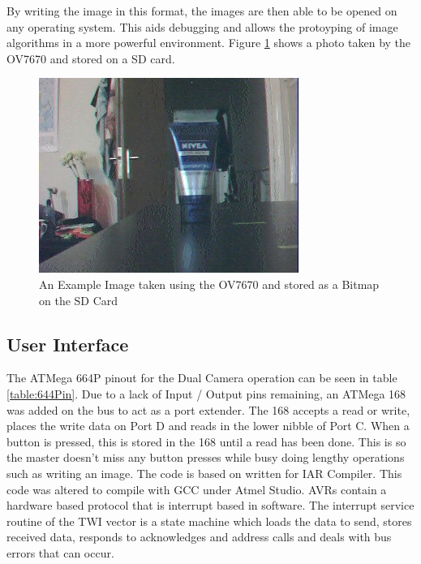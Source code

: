 By writing the image in this format, the images are then able to be opened on any operating system. This aids debugging and allows the protoyping of image algorithms in a more powerful environment. Figure \ref{ExampleImage} shows a photo taken by the OV7670 and stored on a SD card.

\begin{figure}
\begin{center}
\includegraphics{Figures/ExampleImageFromCamera.jpg} 
\end{center}
\caption{An Example Image taken using the OV7670 and stored as a Bitmap on the SD Card}
\label{ExampleImage}
\end{figure}

\subsection{User Interface}
The ATMega 664P pinout for the Dual Camera operation can be seen in table \ref{table:644Pin}. Due to a lack of Input / Output pins remaining, an ATMega 168 was added on the \itc bus to act as a port extender. The 168 accepts a read or write, places the write data on Port D and reads in the lower nibble of Port C. When a button is pressed, this is stored in the 168 until a read has been done. This is so the master doesn't miss any button presses while busy doing lengthy operations such as writing an image. The code is based on \cite{Atmel:I2CSlave} written for IAR Compiler. This code was altered to compile with GCC under Atmel Studio. AVRs contain a hardware based \itc protocol that is interrupt based in software. The interrupt service routine of the TWI vector is a state machine which loads the data to send, stores received data, responds to acknowledges and address calls and deals with bus errors that can occur.

